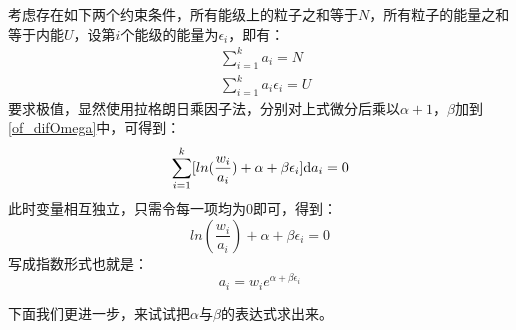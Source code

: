 \begin{prove}
\begin{equation}
                \label{of_difOmega}
            \end{equation}
            考虑存在如下两个约束条件，所有能级上的粒子之和等于$N$，所有粒子的能量之和等于内能$U$，设第$i$个能级的能量为$\epsilon_i$，即有：
            \begin{equation}
                \begin{aligned}
                    &\sum_{i=1}^{k}a_i = N\\
                    &\sum_{i=1}^{k}a_i \epsilon_i = U
                    \label{of_U}
                \end{aligned}
            \end{equation}
            要求极值，显然使用拉格朗日乘因子法，分别对上式微分后乘以$\alpha + 1$，$\beta$加到\ref{of_difOmega}中，可得到：
            \begin{equation}
                \sum_{i=1}^{k} [ln(\frac{w_i}{a_i})+\alpha+\beta \epsilon_i] \mathrm{d}{a_i} = 0
            \end{equation}
            此时变量相互独立，只需令每一项均为0即可，得到：
            \begin{equation}
                ln(\frac{w_i}{a_i})+\alpha+\beta \epsilon_i = 0
                \label{of_a_i}
            \end{equation}
            写成指数形式也就是：
            \begin{equation}
                a_i = w_i e^{\alpha + \beta \epsilon_i}
                \label{of_a_i_2}
            \end{equation}

            下面我们更进一步，来试试把$\alpha$与$\beta$的表达式求出来。


\end{prove}
